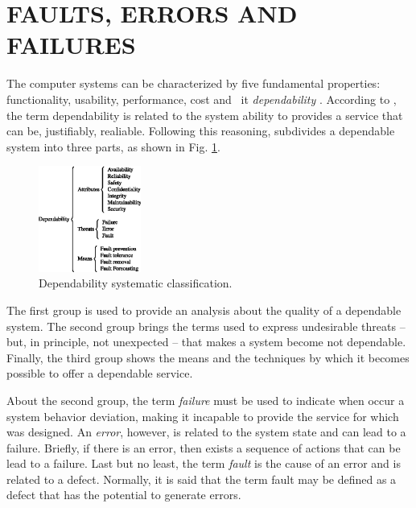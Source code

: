 \documentclass[10pt,fleqn,a4paper]{article}
\begin{document}
\section{FAULTS, ERRORS AND FAILURES}\label{sec:eff}
The computer systems can be characterized by five fundamental properties:
functionality, usability, performance, cost and {\ it} {\it dependability}
\citep{kaaniche:2002}. According to \citet{laprie:1992}, the term dependability
is related to the system ability to provides a service that can be, justifiably,
realiable. Following this reasoning, \citet{avizienis:2000} subdivides a
dependable system into three parts, as shown in Fig. \ref{fig:div_avizienis}.

\begin{figure}[htb]
\centering
\footnotesize
\includegraphics[width=0.3\textwidth]{imgs/div_avizienis}
\caption{Dependability systematic classification.}
\label{fig:div_avizienis}
\end{figure}

The first group is used to provide an analysis about the quality of a dependable
system. The second group brings the terms used to express undesirable threats --
but, in principle, not unexpected -- that makes a system become not dependable.
Finally, the third group shows the means and the techniques by which it becomes
possible to offer a dependable service.

About the second group, the term {\it failure} must be used to indicate when
occur a system behavior deviation, making it incapable to provide the service
for which was designed. An {\it error}, however, is related to the system state
and can lead to a failure. Briefly, if there is an error, then exists a sequence
of actions that can be lead to a failure. Last but no least, the term {\it
fault} is the cause of an error and is related to a defect. Normally, it is said
that the term fault may be defined as a defect that has the potential to generate
errors.
\end{document}
